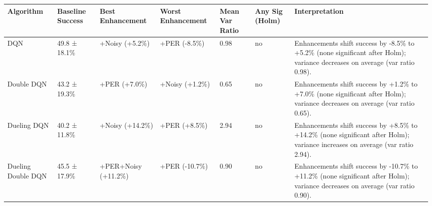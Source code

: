 \begin{tabular}{lllllll}
\toprule
Algorithm & Baseline Success & Best Enhancement & Worst Enhancement & Mean Var Ratio & Any Sig (Holm) & Interpretation \\
\midrule
DQN & 49.8 ± 18.1\% & +Noisy (+5.2\%) & +PER (-8.5\%) & 0.98 & no & Enhancements shift success by -8.5\% to +5.2\% (none significant after Holm); variance decreases on average (var ratio 0.98).  \\
Double DQN & 43.2 ± 19.3\% & +PER (+7.0\%) & +Noisy (+1.2\%) & 0.65 & no & Enhancements shift success by +1.2\% to +7.0\% (none significant after Holm); variance decreases on average (var ratio 0.65).  \\
Dueling DQN & 40.2 ± 11.8\% & +Noisy (+14.2\%) & +PER (+8.5\%) & 2.94 & no & Enhancements shift success by +8.5\% to +14.2\% (none significant after Holm); variance increases on average (var ratio 2.94).  \\
Dueling Double DQN & 45.5 ± 17.9\% & +PER+Noisy (+11.2\%) & +PER (-10.7\%) & 0.90 & no & Enhancements shift success by -10.7\% to +11.2\% (none significant after Holm); variance decreases on average (var ratio 0.90).  \\
\bottomrule
\end{tabular}
